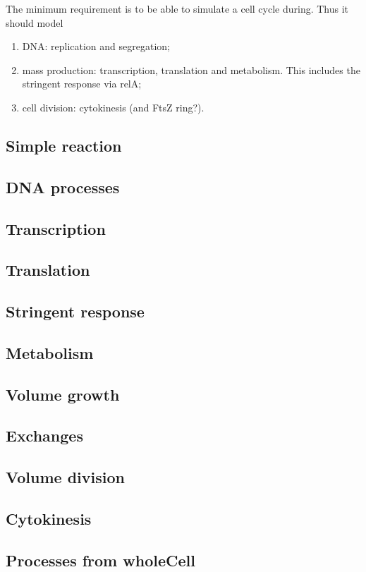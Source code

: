 The minimum requirement is to be able to simulate a cell cycle during. Thus it should model
\begin{enumerate}
  \item DNA: replication and segregation;
  \item mass production: transcription, translation and metabolism. This includes the stringent response via relA;
  \item cell division: cytokinesis (and FtsZ ring?).
\end{enumerate}



\subsection{Simple reaction}


\subsection{DNA processes}


\subsection{Transcription}


\subsection{Translation}


\subsection{Stringent response}


\subsection{Metabolism}


\subsection{Volume growth}


\subsection{Exchanges}


\subsection{Volume division}


\subsection{Cytokinesis}


\subsection{Processes from wholeCell}

